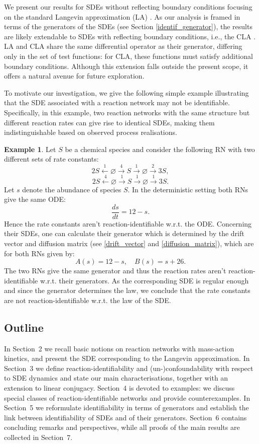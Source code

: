 \documentclass[10pt,a4paper]{amsart}
\let\emptyset\varnothing
\theoremstyle{definition}
\newtheorem{example}[theorem]{Example}
\theoremstyle{remark}
\theoremstyle{consequence}
\numberwithin{equation}{section}
\begin{document}
We present our results for SDEs without reflecting boundary conditions focusing on the standard Langevin approximation (LA) \cite{Kurtz1976,KURTZ1978,approx_kurtz}. As our analysis is framed in terms of the generators of the SDEs (see Section \ref{identif_generator}), the results are likely extendable to SDEs with reflecting boundary conditions, i.e., the CLA \cite{anderson2019constrained,leite2019}. LA and CLA share the same differential operator as their generator, differing only in the set of test functions: for CLA, these functions must satisfy additional boundary conditions. Although this extension falls outside the present scope, it offers a natural avenue for future exploration.

To motivate our investigation, we give the following simple example illustrating that the SDE associated with a reaction network may not be identifiable. Specifically, in this example, two reaction networks with the same structure but different reaction rates can give rise to identical SDEs, making them indistinguishable based on observed process realisations. 

\begin{example}\label{1d_non_ident_generator_intro}
Let $S$ be a chemical species and consider the following RN with two different sets of rate constants:
$$2S\xleftarrow{1}\emptyset\xrightarrow{4}S\xrightarrow{1} \emptyset\xrightarrow{2}3S,$$
$$2S\xleftarrow{4}\emptyset\xrightarrow{1}S \xrightarrow{1} \emptyset\xrightarrow{1}3S .$$
Let $s$ denote the abundance of species $S$. In the deterministic setting both RNs give the same ODE:
$$\frac{ds}{dt}=12-s.$$
Hence the rate constants aren't reaction-identifiable w.r.t. the ODE. Concerning their SDEs, one can calculate their generator which is determined by the drift vector and diffusion matrix (see \eqref{drift_vector} and \eqref{diffusion_matrix}), which are for both RNs given by:
$$A(s)=12-s,\quad B(s)=s+26 .$$
The two RNs give the same generator and thus the reaction rates aren't reaction-identifiable w.r.t. their generators. 
As the corresponding SDE is regular enough and since the generator determines the law, we conclude that the rate constants are not reaction-identifiable w.r.t. the law of the SDE. 
\end{example}

{\subsection*{Outline}
In Section~2 we recall basic notions on reaction networks with mass-action kinetics, and present the SDE corresponding to the Langevin approximation. In Section~3 we define reaction-identifiability and (un-)confoundability with respect to SDE dynamics and state our main characterisations, together with an extension to linear conjugacy. Section~4 is devoted to examples: we discuss special classes of reaction-identifiable networks and provide counterexamples. In Section~5 we reformulate identifiability in terms of generators and establish the link between identifiability of SDEs and of their generators. Section~6 contains concluding remarks and perspectives, while all proofs of the main results are collected in Section~7.
}
\end{document}
